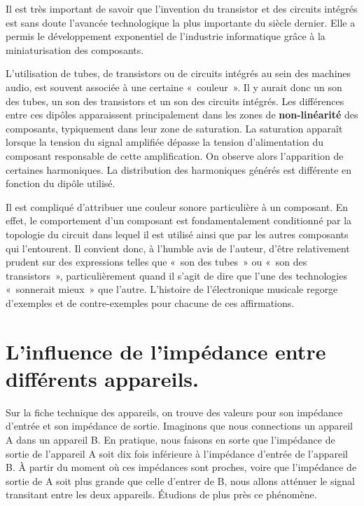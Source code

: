\documentclass[
]{book}
\begin{document}
Il est très important de savoir que l'invention du transistor et des circuits intégrés est sans doute l'avancée technologique la plus importante du siècle dernier. Elle a permis le développement exponentiel de l'industrie informatique grâce à la miniaturisation des composants.

L'utilisation de tubes, de transistors ou de circuits intégrés au sein des machines audio, est souvent associée à une certaine «~couleur~». Il y aurait donc un son des tubes, un son des transistors et un son des circuits intégrés. Les différences entre ces dipôles apparaissent principalement dans les zones de \textbf{non-linéarité} des composants, typiquement dans leur zone de saturation. La saturation apparaît lorsque la tension du signal amplifiée dépasse la tension d'alimentation du composant responsable de cette amplification. On observe alors l'apparition de certaines harmoniques. La distribution des harmoniques générés est différente en fonction du dipôle utilisé.

Il est compliqué d'attribuer une couleur sonore particulière à un composant. En effet, le comportement d'un composant est fondamentalement conditionné par la topologie du circuit dans lequel il est utilisé ainsi que par les autres composants qui l'entourent. Il convient donc, à l'humble avis de l'auteur, d'être relativement prudent sur des expressions telles que «~son des tubes~» ou «~son des transistors~», particulièrement quand il s'agit de dire que l'une des technologies «~sonnerait mieux~» que l'autre. L'histoire de l'électronique musicale regorge d'exemples et de contre-exemples pour chacune de ces affirmations.

\hypertarget{linfluence-de-limpuxe9dance-entre-diffuxe9rents-appareils.}{%
\section{L'influence de l'impédance entre différents appareils.}\label{linfluence-de-limpuxe9dance-entre-diffuxe9rents-appareils.}}

Sur la fiche technique des appareils, on trouve des valeurs pour son impédance d'entrée et son impédance de sortie. Imaginons que nous connections un appareil A dans un appareil B. En pratique, nous faisons en sorte que l'impédance de sortie de l'appareil A soit dix fois inférieure à l'impédance d'entrée de l'appareil B. À partir du moment où ces impédances sont proches, voire que l'impédance de sortie de A soit plus grande que celle d'entrer de B, nous allons atténuer le signal transitant entre les deux appareils. Étudions de plus près ce phénomène.
\end{document}
